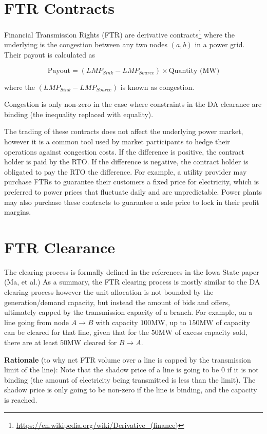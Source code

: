 \documentclass[11pt]{article}
\begin{document}
\section{FTR Contracts}
Financial Transmission Rights (FTR) are derivative contracts\footnote{\url{https://en.wikipedia.org/wiki/Derivative_(finance)}} where the underlying is the congestion between any two nodes $(a, b)$ in a power grid. Their payout is calculated as

$$\text{Payout} = (LMP_{Sink} - LMP_{Source}) \times \text{Quantity (MW)}$$

where the $(LMP_{Sink} - LMP_{Source})$ is known as congestion.

Congestion is only non-zero in the case where constraints in the DA clearance are binding (the inequality replaced with equality).

The trading of these contracts does not affect the underlying power market, however it is a common tool used by market participants to hedge their operations against congestion costs. If the difference is positive, the contract holder is paid by the RTO. If the difference is negative, the contract holder is obligated to pay the RTO the difference. For example, a utility provider may purchase FTRs to guarantee their customers a fixed price for electricity, which is preferred to power prices that fluctuate daily and are unpredictable. Power plants may also purchase these contracts to guarantee a sale price to lock in their profit margins.

\section{FTR Clearance}
The clearing process is formally defined in the references in the Iowa State paper (Ma, et al.) As a summary, the FTR clearing process is mostly similar to the DA clearing process however the unit allocation is not bounded by the generation/demand capacity, but instead the amount of bids and offers, ultimately capped by the transmission capacity of a branch. For example, on a line going from node $A \rightarrow B$ with capacity $100\text{MW}$, up to $150\text{MW}$ of capacity can be cleared for that line, given that for the $50\text{MW}$ of excess capacity sold, there are at least $50\text{MW}$ cleared for $B \rightarrow A$.

\textbf{Rationale} (to why net FTR volume over a line is capped by the transmission limit of the line): Note that the shadow price of a line is going to be 0 if it is not binding (the amount of electricity being transmitted is less than the limit). The shadow price is only going to be non-zero if the line is binding, and the capacity is reached.
\end{document}
